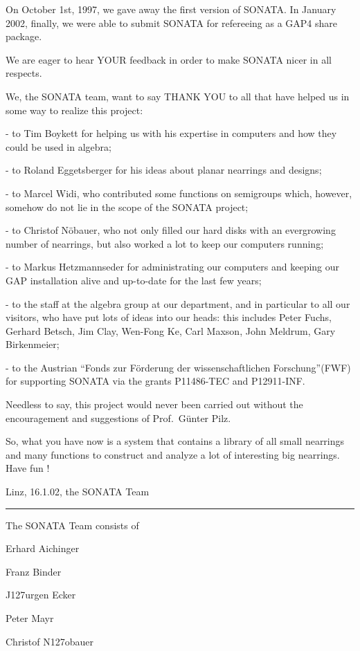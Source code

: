 On October 1st, 1997, we gave away the first version of SONATA.  In
January 2002, finally, we were able to submit SONATA for refereeing as
a GAP4 share package.

We are eager to hear YOUR feedback in order to make SONATA nicer in
all respects.

We, the SONATA team, want to say THANK YOU to all that have helped us
in some way to realize this project:

\begingroup

\smallskip \parindent4pc \parskip 0pt
\item{-} to Tim Boykett for helping us with his expertise
        in computers and how they could be used in algebra;
\item{-} to Roland Eggetsberger for his ideas about planar nearrings and
        designs;
\item{-} to Marcel Widi, who contributed some functions on semigroups which,
        however, somehow do not lie in the scope of the SONATA project;
\item{-} to Christof N\"obauer, who not only filled our hard disks 
        with an evergrowing number of nearrings, but also 
        worked a lot to keep our computers running;
\item{-} to Markus Hetzmannseder for administrating our computers and
        keeping our GAP installation alive and up-to-date for the
        last few years;
\item{-} to the staff at the algebra group at our department,
        and in particular to all our visitors, who have put lots
        of ideas into our heads: this includes Peter Fuchs,
        Gerhard Betsch,  Jim Clay, Wen-Fong Ke, Carl Maxson,
        John Meldrum, Gary Birkenmeier;
\item{-} to the Austrian ``Fonds zur F\"orderung der wissenschaftlichen
        Forschung''(FWF) for supporting SONATA via the grants P11486-TEC
        and P12911-INF.

\endgroup

Needless to say, this project would never been carried out
without the encouragement and suggestions of Prof.~G\"unter Pilz.

So, what you have now is a system that contains a library of 
all small nearrings and many functions to construct and analyze  a lot
of interesting big nearrings. 
Have fun !


Linz, 16.1.02,  the SONATA Team\*

\vfill\hrule

\noindent\llap{\*\enspace}The SONATA Team consists of

\smallskip \parindent4pc \parskip 0pt
\item{} Erhard Aichinger
\item{} Franz Binder
\item{} J\accent127urgen Ecker
\item{} Peter Mayr
\item{} Christof N\accent127obauer
        
\endgroup

